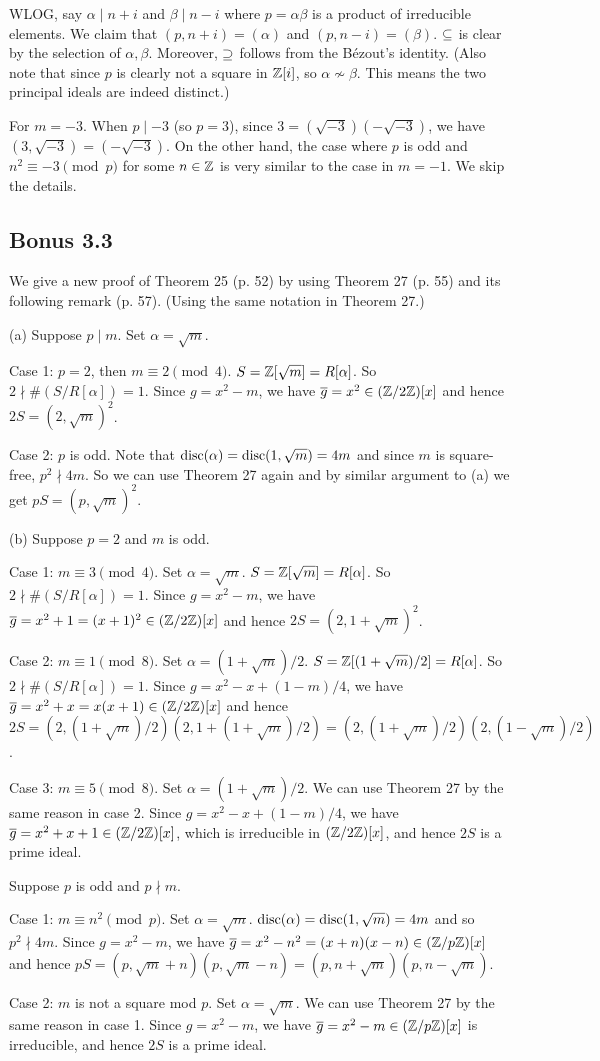 \documentclass[../Marcus.tex]{subfiles}
\begin{document}
WLOG, say $\alpha\mid n+i$ and $\beta\mid n-i$ where $p=\alpha\beta$ is a product of irreducible elements. We claim that $(p,n+i)=(\alpha)$ and $(p,n-i)=(\beta)$. $\subseteq$ is clear by the selection of $\alpha,\beta$. Moreover, $\supseteq$ follows from the Bézout's identity. (Also note that since $p$ is clearly not a square in $\mathbb{Z}[i]$, so $\alpha\nsim\beta$. This means the two principal ideals are indeed distinct.)

For $m=-3$. When $p\mid -3$ (so $p=3$), since $3=(\sqrt{-3})(-\sqrt{-3})$, we have $(3,\sqrt{-3})=(-\sqrt{-3})$. On the other hand, the case where $p$ is odd and $n^2\equiv -3 \pmod{p}$ for some $n\in\mathbb{Z}$ is very similar to the case in $m=-1$. We skip the details.

\subsection*{Bonus 3.3}

We give a new proof of Theorem 25 (p. 52) by using Theorem 27 (p. 55) and its following remark (p. 57). (Using the same notation in Theorem 27.)

(a) Suppose $p\mid m$. Set $\alpha=\sqrt{m}$. 

Case 1: $p=2$, then $m\equiv 2 \pmod{4}$. $S=\mathbb{Z}[\sqrt{m}]=R[\alpha]$. So $2\nmid \#(S/R[\alpha])=1$. Since $g=x^2-m$, we have $\overline{g}=x^2\in(\mathbb{Z}/2\mathbb{Z})[x]$ and hence $2S=(2,\sqrt{m})^2$.

Case 2: $p$ is odd. Note that $\operatorname{disc}(\alpha)=\operatorname{disc}(1,\sqrt{m})=4m$ and since $m$ is square-free, $p^2\nmid 4m$. So we can use Theorem 27 again and by similar argument to (a) we get $pS=(p,\sqrt{m})^2$.

(b) Suppose $p=2$ and $m$ is odd.

Case 1: $m\equiv3\pmod{4}$. Set $\alpha=\sqrt{m}$. $S=\mathbb{Z}[\sqrt{m}]=R[\alpha]$. So $2\nmid \#(S/R[\alpha])=1$. Since $g=x^2-m$, we have $\overline{g}=x^2+1=(x+1)^2\in(\mathbb{Z}/2\mathbb{Z})[x]$ and hence $2S=(2,1+\sqrt{m})^2$.

Case 2: $m\equiv1\pmod{8}$. Set $\alpha=(1+\sqrt{m})/2$. $S=\mathbb{Z}[(1+\sqrt{m})/2]=R[\alpha]$. So $2\nmid \#(S/R[\alpha])=1$. Since $g=x^2-x+(1-m)/4$, we have $\overline{g}=x^2+x=x(x+1)\in(\mathbb{Z}/2\mathbb{Z})[x]$ and hence $2S=(2,(1+\sqrt{m})/2)(2,1+(1+\sqrt{m})/2)=(2,(1+\sqrt{m})/2)(2,(1-\sqrt{m})/2)$.

Case 3: $m\equiv5\pmod{8}$. Set $\alpha=(1+\sqrt{m})/2$. We can use Theorem 27 by the same reason in case 2. Since $g=x^2-x+(1-m)/4$, we have $\overline{g}=x^2+x+1\in(\mathbb{Z}/2\mathbb{Z})[x]$, which is irreducible in $(\mathbb{Z}/2\mathbb{Z})[x]$, and hence $2S$ is a prime ideal.

Suppose $p$ is odd and $p\nmid m$.

Case 1: $m\equiv n^2\pmod{p}$. Set $\alpha=\sqrt{m}$. $\operatorname{disc}(\alpha)=\operatorname{disc}(1,\sqrt{m})=4m$ and so $p^2\nmid 4m$. Since $g=x^2-m$, we have $\overline{g}=x^2-n^2=(x+n)(x-n)\in(\mathbb{Z}/p\mathbb{Z})[x]$ and hence $pS=(p,\sqrt{m}+n)(p,\sqrt{m}-n)=(p,n+\sqrt{m})(p,n-\sqrt{m})$.

Case 2: $m$ is not a square mod $p$. Set $\alpha=\sqrt{m}$. We can use Theorem 27 by the same reason in case 1. Since $g=x^2-m$, we have $\overline{g}=x^2-m\in(\mathbb{Z}/p\mathbb{Z})[x]$ is irreducible, and hence $2S$ is a prime ideal.
\end{document}
